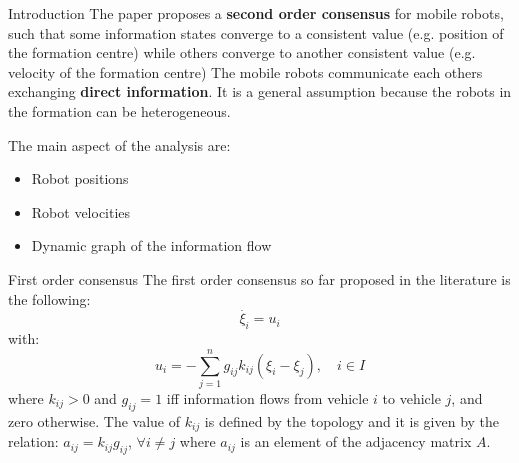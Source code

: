 \begin{frame}{Introduction}
\vskip 0.3cm
The paper proposes a {\textcolor{green!40!black}{\fontsize{13}{15}\textbf{second order consensus}}} for mobile robots, such that some information states converge to a consistent value (e.g. position of the formation centre) while others converge to another consistent value (e.g. velocity of the formation centre) 
\vskip 0.3cm
The mobile robots communicate each others exchanging {\textcolor{green!40!black}{\fontsize{13}{15}\textbf{direct information}}}. It is a general assumption because the robots in the formation can be heterogeneous.

\vskip 0.3cm
The main aspect of the analysis are:
\begin{itemize}
  \item Robot positions
  \item Robot velocities
  \item Dynamic graph of the information flow
\end{itemize}


\end{frame}

\begin{frame}{First order consensus}
\vskip 0.5cm
The first order consensus so far proposed in the literature is the following:
{\textcolor{green!40!black}{\fontsize{13}{15}
$$ \dot{\xi_i} = u_i $$
}}
with:
{\textcolor{green!40!black}{\fontsize{13}{15}
$$u_i = -\sum_{j=1}^{n} {g_{ij} k_{ij} (\xi_i - \xi_j)} , \quad i \in I $$
}}
\vskip 0.2cm
where $k_{ij} > 0$ and $g_{ij} = 1$ iff information flows from vehicle $i$ to vehicle $j$, and zero otherwise.
\vskip 0.2cm
The value of $k_{ij}$ is defined by the topology and it is given by the relation: $a_{ij} = k_{ij} g_{ij}$, $\forall i \neq j$ where $a_{ij}$ is an element of the adjacency matrix $A$.

\end{frame}